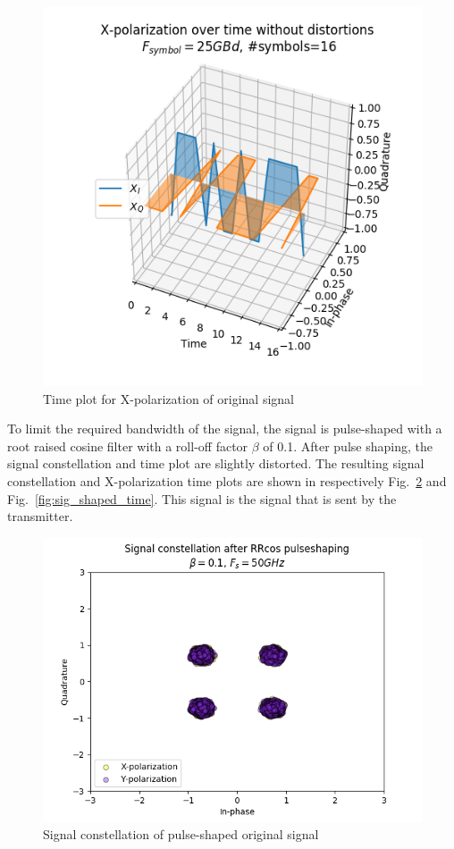 \documentclass[journal,10pt,twoside, a4paper]{IEEEtran}
\begin{document}
\begin{figure}
    \centering
    \includegraphics[width=\linewidth]{Thesis/images/sig_time}
    \caption{Time plot for X-polarization of original signal}
    \label{fig:sig_time}
\end{figure}

To limit the required bandwidth of the signal, the signal is pulse-shaped with a root raised cosine filter with a roll-off factor $\beta$ of 0.1. After pulse shaping, the signal constellation and time plot are slightly distorted. The resulting signal constellation and X-polarization time plots are shown in respectively Fig.~\ref{fig:sig_shaped} and Fig.~\ref{fig:sig_shaped_time}. This signal is the signal that is sent by the transmitter.

\begin{figure}
    \centering
    \includegraphics[width=\linewidth]{Thesis/images/sig_shaped}
    \caption{Signal constellation of pulse-shaped original signal}
    \label{fig:sig_shaped}
\end{figure}
\end{document}
